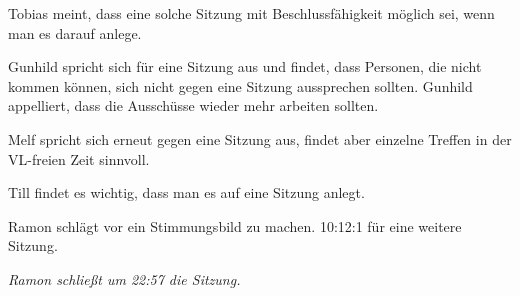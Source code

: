 \documentclass[ngerman,headheight=70pt]{scrartcl}
\begin{document}
    Tobias meint, dass eine solche Sitzung mit Beschlussfähigkeit möglich sei,
    wenn man es darauf anlege.

    Gunhild spricht sich für eine Sitzung aus und findet, dass Personen, die nicht
    kommen können, sich nicht gegen eine Sitzung aussprechen sollten.
    Gunhild appelliert, dass die Ausschüsse wieder mehr arbeiten sollten.

    Melf spricht sich erneut gegen eine Sitzung aus, findet aber einzelne
    Treffen in der VL-freien Zeit sinnvoll.

    Till findet es wichtig, dass man es auf eine Sitzung anlegt.

    Ramon schlägt vor ein Stimmungsbild zu machen. 10:12:1 für eine weitere Sitzung.

    \textit{Ramon schließt um 22:57 die Sitzung.}
\end{document}
